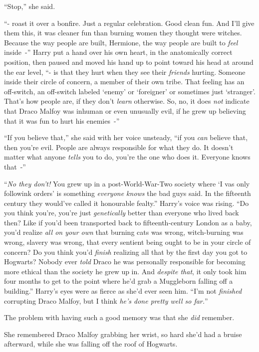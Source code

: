 ``Stop,'' she said.

``- roast it over a bonfire. Just a regular celebration. Good clean fun. And I'll give them this, it was cleaner fun than burning women they thought were witches. Because the way people are built, Hermione, the way people are built to \emph{feel} inside~-'' Harry put a hand over his own heart, in the anatomically correct position, then paused and moved his hand up to point toward his head at around the ear level, ``- is that they hurt when they see their \emph{friends} hurting. Someone inside their circle of concern, a member of their own tribe. That feeling has an off-switch, an off-switch labeled `enemy' or `foreigner' or sometimes just `stranger'. That's how people are, if they don't \emph{learn} otherwise. So, no, it does \emph{not} indicate that Draco Malfoy was inhuman or even unusually evil, if he grew up believing that it was fun to hurt his enemies~-''

``If you believe that\emph{,}'' she said with her voice unsteady, ``if you \emph{can} believe that, then you're evil. People are always responsible for what they do. It doesn't matter what anyone \emph{tells} you to do, you're the one who does it. Everyone knows that~-''

``\emph{No they don't!} You grew up in a post-World-War-Two society where `I vas only followink orders' is something \emph{everyone knows} the bad guys said. In the fifteenth century they would've called it honourable fealty.'' Harry's voice was rising. ``Do you think you're, you're just \emph{genetically} better than everyone who lived back then? Like if you'd been transported back to fifteenth-century London as a baby, you'd realize \emph{all on your own} that burning cats was wrong, witch-burning was wrong, slavery was wrong, that every sentient being ought to be in your circle of concern? Do you think you'd \emph{finish} realizing all that by the first day you got to Hogwarts? Nobody ever \emph{told} Draco he was personally responsible for becoming more ethical than the society he grew up in. And \emph{despite that}, it only took him four months to get to the point where he'd grab a Muggleborn falling off a building.'' Harry's eyes were as fierce as she'd ever seen him. ``I'm not \emph{finished} corrupting Draco Malfoy, but I think \emph{he's done pretty well so far.}''

The problem with having such a good memory was that she \emph{did} remember.

She remembered Draco Malfoy grabbing her wrist, so hard she'd had a bruise afterward, while she was falling off the roof of Hogwarts.

